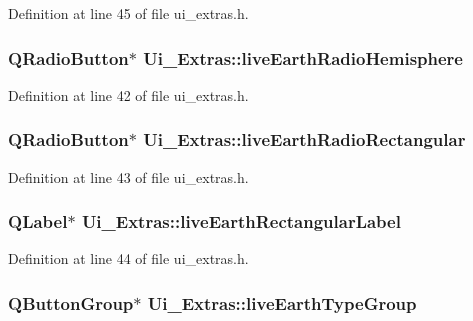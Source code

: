 Definition at line 45 of file ui\_\-extras.h.

\hypertarget{classUi__Extras_a610559fbdb9e6613573ed1f8a5b3e2db}{
\subsubsection[{liveEarthRadioHemisphere}]{\setlength{\rightskip}{0pt plus 5cm}QRadioButton$\ast$ {\bf Ui\_\-Extras::liveEarthRadioHemisphere}}}
\label{classUi__Extras_a610559fbdb9e6613573ed1f8a5b3e2db}


Definition at line 42 of file ui\_\-extras.h.

\hypertarget{classUi__Extras_a82b9691ce85e1f9a0acc5b7b3ecb93d9}{
\subsubsection[{liveEarthRadioRectangular}]{\setlength{\rightskip}{0pt plus 5cm}QRadioButton$\ast$ {\bf Ui\_\-Extras::liveEarthRadioRectangular}}}
\label{classUi__Extras_a82b9691ce85e1f9a0acc5b7b3ecb93d9}


Definition at line 43 of file ui\_\-extras.h.

\hypertarget{classUi__Extras_a47b81ab7a2a08615128f151dd5598384}{
\subsubsection[{liveEarthRectangularLabel}]{\setlength{\rightskip}{0pt plus 5cm}QLabel$\ast$ {\bf Ui\_\-Extras::liveEarthRectangularLabel}}}
\label{classUi__Extras_a47b81ab7a2a08615128f151dd5598384}


Definition at line 44 of file ui\_\-extras.h.

\hypertarget{classUi__Extras_a3b0e012edd2308486189a348211a84c6}{
\subsubsection[{liveEarthTypeGroup}]{\setlength{\rightskip}{0pt plus 5cm}QButtonGroup$\ast$ {\bf Ui\_\-Extras::liveEarthTypeGroup}}}
\label{classUi__Extras_a3b0e012edd2308486189a348211a84c6}


